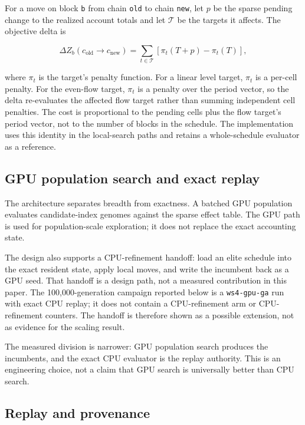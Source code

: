 \documentclass[preprint,11pt]{elsarticle}
\begin{document}
For a move on block \texttt{b} from chain \texttt{old} to chain \texttt{new}, let $p$ be the sparse
pending change to the realized account totals and let $\mathcal{T}$ be the targets it affects. The
objective delta is

\begin{equation}
\Delta Z_b(c_{\mathrm{old}}\!\to c_{\mathrm{new}})
= \sum_{t\in\mathcal{T}}\left[\pi_t(T+p)-\pi_t(T)\right],
\end{equation}

where $\pi_t$ is the target's penalty function. For a linear level target, $\pi_t$ is a per-cell
penalty. For the even-flow target, $\pi_t$ is a penalty over the period vector, so the delta
re-evaluates the affected flow target rather than summing independent cell penalties. The cost is
proportional to the pending cells plus the flow target's period vector, not to the number of blocks
in the schedule. The implementation uses this identity in the local-search paths and retains a
whole-schedule evaluator as a reference.

\subsection{GPU population search and exact replay}\label{gpu-population-search-and-cpu-refinement}

The architecture separates breadth from exactness. A batched GPU population evaluates candidate-index genomes against the sparse effect table. The GPU path is used for population-scale exploration; it does not replace the exact accounting state.

The design also supports a CPU-refinement handoff: load an elite schedule into the exact resident state, apply local moves, and write the incumbent back as a GPU seed. That handoff is a design path, not a measured contribution in this paper. The 100,000-generation campaign reported below is a \texttt{ws4-gpu-ga} run with exact CPU replay; it does not contain a CPU-refinement arm or CPU-refinement counters. The handoff is therefore shown as a possible extension, not as evidence for the scaling result.

The measured division is narrower: GPU population search produces the incumbents, and the exact CPU evaluator is the replay authority. This is an engineering choice, not a claim that GPU search is universally better than CPU search.

\subsection{Replay and provenance}\label{replay-and-provenance}
\end{document}
